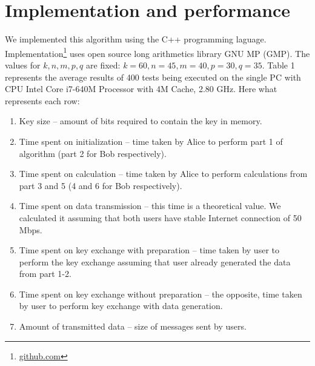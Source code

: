 \section{Implementation and performance}
	We implemented this algorithm using the C++ programming laguage. Implementation\footnote{\href{https://github.com/dargonaxxe/homomorphic-encryption-key-exchange}{github.com}} uses open source long arithmetics library GNU MP (GMP). The values for $ k, n, m, p, q $ are fixed: $ k = 60, n = 45, m = 40, p = 30, q = 35 $. Table 1 represents the average results of 400 tests being executed on the single PC with CPU Intel Core i7-640M Processor with 4M Cache, 2.80 GHz. Here what represents each row:
	\begin{enumerate}
		\item Key size -- amount of bits required to contain the key in memory. 
		\item Time spent on initialization -- time taken by Alice to perform part 1 of algorithm (part 2 for Bob respectively).
		\item Time spent on calculation -- time taken by Alice to perform calculations from part 3 and 5 (4 and 6 for Bob respectively).
		\item Time spent on data transmission -- this time is a theoretical value. We calculated it assuming that both users have stable Internet connection of 50 Mbps.
		\item Time spent on key exchange with preparation -- time taken by user to perform the key exchange assuming that user already generated the data from part 1-2. 
		\item Time spent on key exchange without preparation -- the opposite, time taken by user to perform key exchange with data generation.
		\item Amount of transmitted data -- size of messages sent by users. 
	\end{enumerate}
	